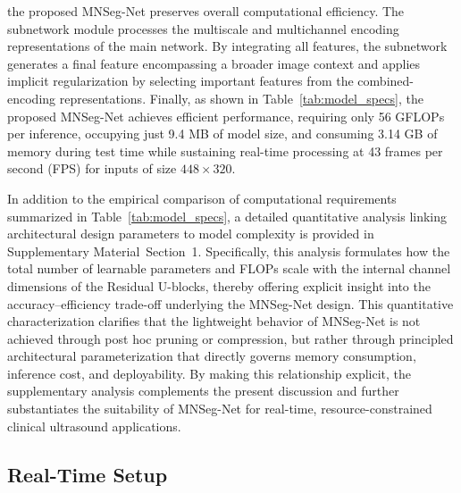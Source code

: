 the proposed MNSeg-Net preserves overall computational efficiency. The subnetwork module processes the multiscale and multichannel encoding representations of the main network. By integrating all features, the subnetwork generates a final feature encompassing a broader image context and applies implicit regularization by selecting important features from the combined-encoding representations.  Finally, as shown in Table~\ref{tab:model_specs}, the proposed MNSeg-Net achieves efficient performance, requiring only 56 GFLOPs per inference, occupying just 9.4 MB of model size, and consuming 3.14 GB of memory during test time while sustaining real-time processing at 43 frames per second (FPS) for inputs of size $448 \times 320$. 





In addition to the empirical comparison of computational requirements summarized in Table~\ref{tab:model_specs}, a detailed quantitative analysis linking architectural design parameters to model complexity is provided in Supplementary Material~Section~1. Specifically, this analysis formulates how the total number of learnable parameters and FLOPs scale with the internal channel dimensions of the Residual U-blocks, thereby offering explicit insight into the accuracy--efficiency trade-off underlying the MNSeg-Net design. This quantitative characterization clarifies that the lightweight behavior of MNSeg-Net is not achieved through post hoc pruning or compression, but rather through principled architectural parameterization that directly governs memory consumption, inference cost, and deployability. By making this relationship explicit, the supplementary analysis complements the present discussion and further substantiates the suitability of MNSeg-Net for real-time, resource-constrained clinical ultrasound applications.


\subsection{Real-Time Setup}

